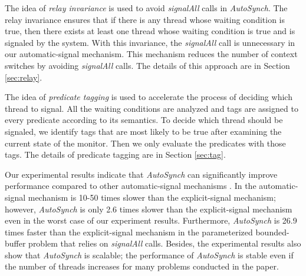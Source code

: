 \documentclass{sigplanconf}
\begin{document}
The idea of {\em relay invariance} is used to avoid {\em signalAll} calls in {\em
AutoSynch}.
The relay invariance ensures that if there is any thread whose waiting condition is true, then
there exists at least one thread whose waiting condition is  true and is signaled by the system.
With this invariance, the {\em signalAll} call 
is unnecessary in our automatic-signal mechanism. This mechanism reduces 
the number of context switches by avoiding {\em signalAll} calls. 
The details of this approach are in Section \ref{sec:relay}.


The idea of {\em predicate tagging} is used to accelerate the process of deciding which thread to signal.
All the waiting conditions are analyzed and tags are assigned to every predicate
according to its semantics. To decide which thread should be 
signaled, we identify tags that are most likely to be true after examining the 
current state of the monitor. Then we only evaluate the predicates with 
those tags. 
The details of predicate tagging are in Section \ref{sec:tag}.

Our experimental results indicate that {\em AutoSynch} can significantly improve
performance compared to other automatic-signal mechanisms \cite{bh05}. In \cite{bfc95,bh05}
the automatic-signal mechanism is 10-50 times
slower than the explicit-signal mechanism; however, {\em AutoSynch} is 
only 2.6 times slower than the explicit-signal mechanism even in the worst 
case of our experiment results. Furthermore, {\em AutoSynch} is 26.9
times faster than the explicit-signal mechanism in the parameterized
bounded-buffer problem that relies on 
{\em signalAll} calls. Besides, the experimental results also show that {\em AutoSynch} 
is scalable; the performance of {\em AutoSynch} is stable even if the number of 
threads increases for many problems conducted in the paper. 
\end{document}
